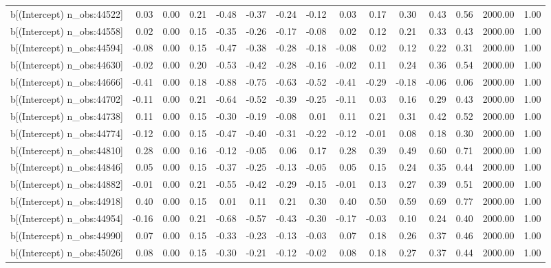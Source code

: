 \begin{table}[ht]
\begin{tabular}{rrrrrrrrrrrrrrr}
  b[(Intercept) n\_obs:44522] & 0.03 & 0.00 & 0.21 & -0.48 & -0.37 & -0.24 & -0.12 & 0.03 & 0.17 & 0.30 & 0.43 & 0.56 & 2000.00 & 1.00 \\ 
  b[(Intercept) n\_obs:44558] & 0.02 & 0.00 & 0.15 & -0.35 & -0.26 & -0.17 & -0.08 & 0.02 & 0.12 & 0.21 & 0.33 & 0.43 & 2000.00 & 1.00 \\ 
  b[(Intercept) n\_obs:44594] & -0.08 & 0.00 & 0.15 & -0.47 & -0.38 & -0.28 & -0.18 & -0.08 & 0.02 & 0.12 & 0.22 & 0.31 & 2000.00 & 1.00 \\ 
  b[(Intercept) n\_obs:44630] & -0.02 & 0.00 & 0.20 & -0.53 & -0.42 & -0.28 & -0.16 & -0.02 & 0.11 & 0.24 & 0.36 & 0.54 & 2000.00 & 1.00 \\ 
  b[(Intercept) n\_obs:44666] & -0.41 & 0.00 & 0.18 & -0.88 & -0.75 & -0.63 & -0.52 & -0.41 & -0.29 & -0.18 & -0.06 & 0.06 & 2000.00 & 1.00 \\ 
  b[(Intercept) n\_obs:44702] & -0.11 & 0.00 & 0.21 & -0.64 & -0.52 & -0.39 & -0.25 & -0.11 & 0.03 & 0.16 & 0.29 & 0.43 & 2000.00 & 1.00 \\ 
  b[(Intercept) n\_obs:44738] & 0.11 & 0.00 & 0.15 & -0.30 & -0.19 & -0.08 & 0.01 & 0.11 & 0.21 & 0.31 & 0.42 & 0.52 & 2000.00 & 1.00 \\ 
  b[(Intercept) n\_obs:44774] & -0.12 & 0.00 & 0.15 & -0.47 & -0.40 & -0.31 & -0.22 & -0.12 & -0.01 & 0.08 & 0.18 & 0.30 & 2000.00 & 1.00 \\ 
  b[(Intercept) n\_obs:44810] & 0.28 & 0.00 & 0.16 & -0.12 & -0.05 & 0.06 & 0.17 & 0.28 & 0.39 & 0.49 & 0.60 & 0.71 & 2000.00 & 1.00 \\ 
  b[(Intercept) n\_obs:44846] & 0.05 & 0.00 & 0.15 & -0.37 & -0.25 & -0.13 & -0.05 & 0.05 & 0.15 & 0.24 & 0.35 & 0.44 & 2000.00 & 1.00 \\ 
  b[(Intercept) n\_obs:44882] & -0.01 & 0.00 & 0.21 & -0.55 & -0.42 & -0.29 & -0.15 & -0.01 & 0.13 & 0.27 & 0.39 & 0.51 & 2000.00 & 1.00 \\ 
  b[(Intercept) n\_obs:44918] & 0.40 & 0.00 & 0.15 & 0.01 & 0.11 & 0.21 & 0.30 & 0.40 & 0.50 & 0.59 & 0.69 & 0.77 & 2000.00 & 1.00 \\ 
  b[(Intercept) n\_obs:44954] & -0.16 & 0.00 & 0.21 & -0.68 & -0.57 & -0.43 & -0.30 & -0.17 & -0.03 & 0.10 & 0.24 & 0.40 & 2000.00 & 1.00 \\ 
  b[(Intercept) n\_obs:44990] & 0.07 & 0.00 & 0.15 & -0.33 & -0.23 & -0.13 & -0.03 & 0.07 & 0.18 & 0.26 & 0.37 & 0.46 & 2000.00 & 1.00 \\ 
  b[(Intercept) n\_obs:45026] & 0.08 & 0.00 & 0.15 & -0.30 & -0.21 & -0.12 & -0.02 & 0.08 & 0.18 & 0.27 & 0.37 & 0.44 & 2000.00 & 1.00 \\ 

\end{tabular}
\end{table}
